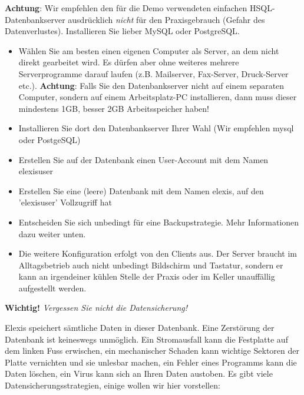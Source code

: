 \textbf{Achtung}: Wir empfehlen den für die Demo verwendeten einfachen HSQL-Datenbankserver ausdrücklich \textit{nicht} für den Praxisgebrauch (Gefahr des Datenverlustes). Installieren Sie lieber MySQL oder PostgreSQL.
\begin{itemize}
 \item Wählen Sie am besten einen eigenen Computer als Server, an dem nicht direkt gearbeitet wird. Es dürfen aber ohne
 weiteres mehrere Serverprogramme darauf laufen (z.B. Mailserver, Fax-Server, Druck-Server etc.). \textbf{Achtung}: Falls Sie den Datenbankserver nicht auf einem separaten Computer, sondern auf einem Arbeitsplatz-PC installieren, dann muss dieser mindestens 1GB, besser 2GB Arbeitsspeicher haben!
 \item Installieren Sie dort den Datenbankserver Ihrer Wahl (Wir empfehlen mysql oder PostgeSQL)
 \item Erstellen Sie auf der Datenbank einen User-Account mit dem Namen elexisuser
 \item Erstellen Sie eine (leere) Datenbank mit dem Namen elexis, auf den 'elexisuser' Vollzugriff hat
 \item Entscheiden Sie sich unbedingt für eine Backupstrategie. Mehr Informationen dazu weiter unten.
 \item Die weitere Konfiguration erfolgt von den Clients aus. Der Server braucht im Alltagsbetrieb auch nicht unbedingt
 Bildschirm und Tastatur, sondern er kann an irgendeiner kühlen Stelle der Praxis oder im Keller unauffällig
 aufgestellt werden.
\end{itemize}

\textbf{Wichtig!}
\textit{Vergessen Sie nicht die Datensicherung!}

Elexis speichert sämtliche Daten in dieser Datenbank. Eine Zerstörung der Datenbank ist keineswegs unmöglich.
Ein Stromausfall kann die Festplatte  \glqq  auf dem linken Fuss\grqq{}  erwischen,
ein mechanischer Schaden kann wichtige Sektoren der Platte vernichten und sie
unlesbar machen, ein Fehler eines Programms kann die Daten löschen, ein Virus
kann sich an Ihren Daten austoben. Es gibt viele Datensicherungsstrategien,
einige wollen wir hier vorstellen:

